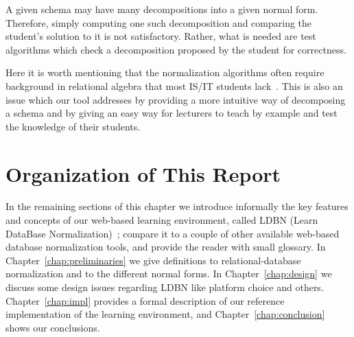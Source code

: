 A given schema may have many decompositions into a given normal form.
Therefore, simply computing one such decomposition and comparing the
student's solution to it is not satisfactory.  Rather, what is needed
are test algorithms which check a decomposition proposed by the student for
correctness.

%

Here it is worth mentioning that the normalization algorithms often require 
background in relational algebra that most IS/IT students lack~\cite{p8}. This
is also an issue which our tool addresses by providing a more intuitive 
way of decomposing a schema and by giving an easy way for lecturers to
teach by example and test the knowledge of their students. 

\section{Organization of This Report}
\label{sec:organization}
In the remaining sections of this chapter we introduce informally 
the key features and concepts of our web-based learning environment, 
called LDBN (Learn DataBase Normalization)~\cite{wldbn}; 
compare it to a couple of other 
available web-based database normalization tools, and provide the reader with small glossary.  
In Chapter~\ref{chap:preliminaries} we give definitions to
relational-database normalization and to the different normal forms. 
In Chapter~\ref{chap:design} we discuss some design issues regarding LDBN like 
platform choice and others. Chapter~\ref{chap:impl} provides a formal description
of our reference implementation of the learning environment, and
Chapter~\ref{chap:conclusion} shows our conclusions.

